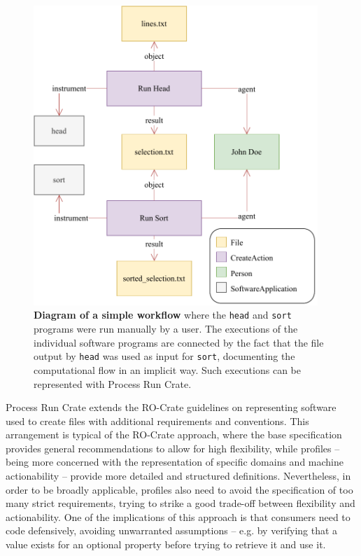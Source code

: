 \documentclass[10pt,letterpaper]{article}
\begin{document}
\begin{figure}[!ht]
\includegraphics[width=29em]{wrroc-figure-example.drawio.pdf}
\caption{{\bf Diagram of a simple workflow} where the \texttt{head} and \texttt{sort} programs were run manually by a user.
The executions of the individual software programs are connected by the fact that the file output by \texttt{head} was used as input for \texttt{sort}, documenting the computational flow in an implicit way.
Such executions can be represented with Process Run Crate.}
\label{fig:head_sort}
\end{figure}


Process Run Crate extends the RO-Crate guidelines on representing software used to create files with additional requirements and conventions.
This arrangement is typical of the RO-Crate approach, where the base specification provides general recommendations to allow for high flexibility, while profiles -- being more concerned with the representation of specific domains and machine actionability -- provide more detailed and structured definitions.
Nevertheless, in order to be broadly applicable, profiles also need to avoid the specification of too many strict requirements, trying to strike a good trade-off between flexibility and actionability.
One of the implications of this approach is that consumers need to code defensively, avoiding unwarranted assumptions -- e.g. by verifying that a value exists for an optional property before trying to retrieve it and use it.
\end{document}
